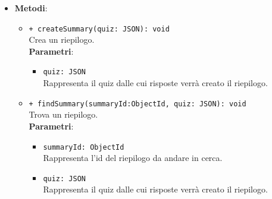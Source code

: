 \begin{itemize}
\begin{itemize}
\begin{itemize}
				\end{itemize}
		\end{itemize}
	\item \textbf{Metodi}:
		\begin{itemize}
			\item \texttt{+ createSummary(quiz: JSON): void}\\
			Crea un riepilogo.\\
			\textbf{Parametri}:
			\begin{itemize}
				\item \texttt{quiz: JSON}\\
				Rappresenta il quiz dalle cui risposte verrà creato il riepilogo.
			\end{itemize}
			\item \texttt{+ findSummary(summaryId:ObjectId, quiz: JSON): void}\\
			Trova un riepilogo.\\
			\textbf{Parametri}:
			\begin{itemize}
				\item \texttt{summaryId: ObjectId}\\
					Rappresenta l'id del riepilogo da andare in cerca.
				\item \texttt{quiz: JSON}\\
				Rappresenta il quiz dalle cui risposte verrà creato il riepilogo.
			\end{itemize}	
		\end{itemize}
\end{itemize}